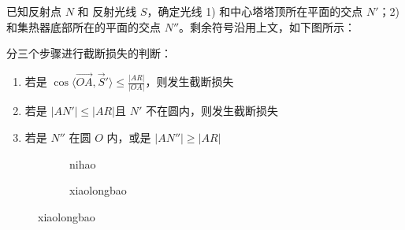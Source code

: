 \documentclass[../main.tex]{subfiles}
\begin{document}
已知反射点 \(N\) 和 反射光线 \(S\)，确定光线 1) 和中心塔塔顶所在平面的交点 \(N'\)；2) 和集热器底部所在的平面的交点 \(N''\)。剩余符号沿用上文，如下图所示：

分三个步骤进行截断损失的判断：
\begin{enumerate}
\item 若是 \( \displaystyle\cos \langle \overrightarrow{OA}, \vec S' \rangle\le \frac{\vert AR \vert}{\vert OA \vert}\)，则发生截断损失
\item 若是 \(\vert AN'\vert \le \vert AR \vert\)且 \(N'\) 不在圆内，则发生截断损失
\item 若是 \(N''\) 在圆 \(O\) 内，或是 \(\vert AN'' \vert \ge \vert AR \vert\)
\end{enumerate}


\begin{figure}[H]
\centering
\begin{subfigure}[b]{0.4\textwidth}
\centering

\caption{nihao}
\end{subfigure}
\begin{subfigure}[b]{0.4\textwidth}
\centering

\caption{xiaolongbao}
\end{subfigure}
\end{figure}
\end{document}
